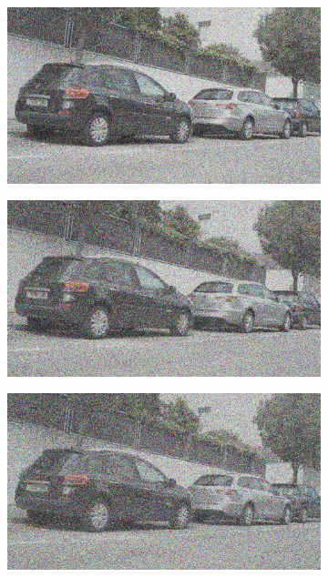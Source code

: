 \documentclass[a4paper]{ctexart}
\begin{document}
\begin{figure}[htbp]
\begin{subfigure}{0.08\textwidth}
				\label{fig：Gamma=1.0, Gauss Noise = 0.4}
			\end{subfigure}
			\begin{subfigure}{0.08\textwidth}
				\captionsetup{font=scriptsize}
				\includegraphics[width=\linewidth]{picture/Edge Detection/degrade/RGB_001 Gamma=1.0, Gauss Noise=0.5}
				\label{fig：Gamma=1.0, Gauss Noise = 0.5}
			\end{subfigure}
			\begin{subfigure}{0.08\textwidth}
				\captionsetup{font=scriptsize}
				\includegraphics[width=\linewidth]{picture/Edge Detection/degrade/RGB_001 Gamma=1.0, Gauss Noise=0.6}
				\label{fig：Gamma=1.0, Gauss Noise = 0.6}
			\end{subfigure}
			\begin{subfigure}{0.08\textwidth}
				\captionsetup{font=scriptsize}
				\includegraphics[width=\linewidth]{picture/Edge Detection/degrade/RGB_001 Gamma=1.0, Gauss Noise=0.7}

\end{subfigure}
\end{figure}
\end{document}
